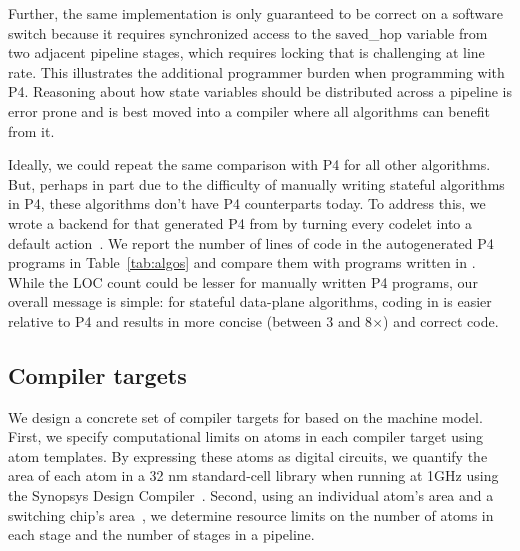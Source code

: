 Further, the same implementation is only guaranteed to be correct on a software
switch because it requires synchronized access to the saved\_hop variable from
two adjacent pipeline stages, which requires locking that is challenging at
line rate. This illustrates the additional programmer burden when programming
with P4. Reasoning about how state variables should be distributed across a
pipeline is error prone and is best moved into a compiler where all algorithms
can benefit from it.

Ideally, we could repeat the same comparison with P4 for all other algorithms.
But, perhaps in part due to the difficulty of manually writing stateful
algorithms in P4, these algorithms don't have P4 counterparts today. To address
this, we wrote a backend for \pktlanguage that generated P4 from \pktlanguage
by turning every codelet into a default action~\cite{p4spec}.  We report the
number of lines of code in the autogenerated P4 programs in
Table~\ref{tab:algos} and compare them with programs written in
\pktlanguage. While the LOC count could be lesser for manually written P4
programs, our overall message is simple: for stateful data-plane algorithms,
coding in \pktlanguage is easier relative to P4 and results in more concise
(between 3 and 8$\times$) and correct code.


\subsection{Compiler targets}
\label{ss:targets}

We design a concrete set of compiler targets for \pktlanguage based on the
\absmachine machine model. First, we specify computational limits on atoms in
each compiler target using atom templates. By expressing these atoms as digital
circuits, we quantify the area of each atom in a 32 nm standard-cell library
when running at 1GHz using the Synopsys Design Compiler~\cite{synopsys_dc}.
Second, using an individual atom's area and a switching chip's
area~\cite{gibb_parsing}, we determine resource limits on the number of atoms
in each stage and the number of stages in a pipeline.

